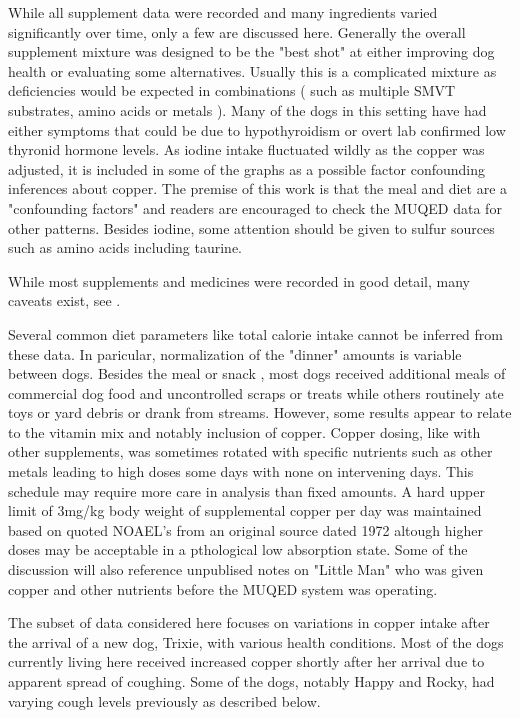 While all supplement data were recorded and many
ingredients  varied significantly over time, only a few are discussed here. 
Generally the overall supplement mixture was designed to be the "best shot"
at either improving dog health or evaluating some alternatives.
Usually this is a complicated mixture as deficiencies would be expected
in combinations ( such as multiple SMVT substrates, amino acids or metals ). 
Many of the dogs in this setting have had either symptoms
that could be due to hypothyroidism or overt lab confirmed
low thyronid hormone levels. As iodine intake fluctuated 
wildly as the copper was adjusted, it is included in some of the graphs as 
a possible factor confounding inferences about copper. 
The premise of this work is that the  meal and diet are 
a "confounding factors" and readers are encouraged to check
the MUQED data for other patterns. Besides iodine,  
some attention should
be given to sulfur sources such as amino acids including taurine.  


While most supplements and medicines were recorded 
in good detail,  many caveats exist, see .

Several common diet parameters like total calorie intake cannot be inferred
from these data.
In paricular, normalization of the "dinner" amounts is variable
between dogs.
Besides the meal or snack ,
most dogs received additional meals of commercial dog food
and uncontrolled scraps or treats while others
routinely ate toys or yard debris or drank from streams. However, some 
results appear to relate to the vitamin mix and notably
inclusion of copper. 
Copper dosing, like with other supplements,  was sometimes rotated 
with specific nutrients such as other metals
leading to high doses some days with none on intervening days. 
This schedule may require more care in analysis than fixed amounts.
A hard upper limit of
3mg/kg body weight of supplemental copper per day was maintained  based 
on quoted NOAEL's from an  original source dated  1972 \cite{NAP9782}
altough higher doses may be acceptable in 
a pthological low absorption state. 
Some of the discussion will also reference unpublised notes
on "Little Man" who was given copper and other 
nutrients before the MUQED system was operating.

The subset of data considered here focuses on variations in copper
intake after the arrival of a new dog, Trixie, with various health
conditions.  
Most of the dogs currently living here received increased copper
shortly after her arrival due to apparent
spread of coughing. 
Some of the dogs, notably Happy and Rocky, had varying cough levels
previously as described below.  

